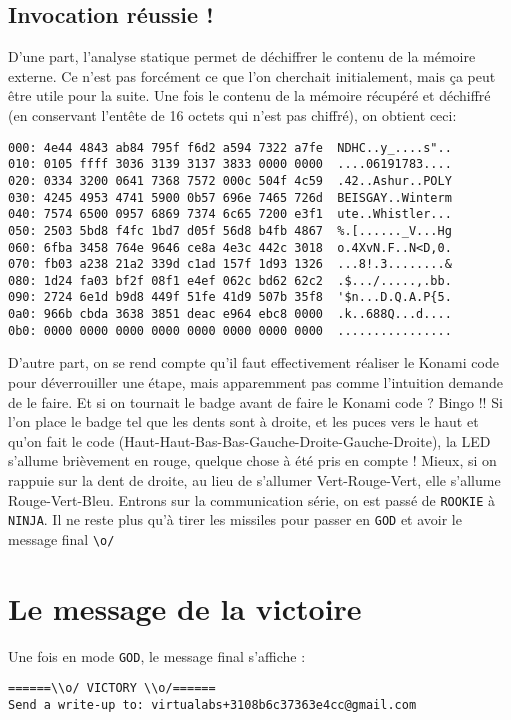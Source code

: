 \documentclass[11pt]{article}
\newcommand{\ttt}[1]{\texttt{#1}}
\begin{document}
    \subsection{Invocation réussie !}

    D'une part, l'analyse statique permet de déchiffrer le contenu de la mémoire externe. Ce n'est pas forcément ce que l'on cherchait initialement, mais ça peut être utile pour la suite. Une fois le contenu de la mémoire récupéré et déchiffré (en conservant l'entête de 16 octets qui n'est pas chiffré), on obtient ceci:

\begin{verbatim}
000: 4e44 4843 ab84 795f f6d2 a594 7322 a7fe  NDHC..y_....s"..
010: 0105 ffff 3036 3139 3137 3833 0000 0000  ....06191783....
020: 0334 3200 0641 7368 7572 000c 504f 4c59  .42..Ashur..POLY
030: 4245 4953 4741 5900 0b57 696e 7465 726d  BEISGAY..Winterm
040: 7574 6500 0957 6869 7374 6c65 7200 e3f1  ute..Whistler...
050: 2503 5bd8 f4fc 1bd7 d05f 56d8 b4fb 4867  %.[......_V...Hg
060: 6fba 3458 764e 9646 ce8a 4e3c 442c 3018  o.4XvN.F..N<D,0.
070: fb03 a238 21a2 339d c1ad 157f 1d93 1326  ...8!.3........&
080: 1d24 fa03 bf2f 08f1 e4ef 062c bd62 62c2  .$.../.....,.bb.
090: 2724 6e1d b9d8 449f 51fe 41d9 507b 35f8  '$n...D.Q.A.P{5.
0a0: 966b cbda 3638 3851 deac e964 ebc8 0000  .k..688Q...d....
0b0: 0000 0000 0000 0000 0000 0000 0000 0000  ................
\end{verbatim}

    D'autre part, on se rend compte qu'il faut effectivement réaliser le Konami code pour déverrouiller une étape, mais apparemment pas comme l'intuition demande de le faire. Et si on tournait le badge avant de faire le Konami code ? Bingo !! Si l'on place le badge tel que les dents sont à droite, et les puces vers le haut et qu'on fait le code (Haut-Haut-Bas-Bas-Gauche-Droite-Gauche-Droite), la LED s'allume brièvement en rouge, quelque chose à été pris en compte !
  Mieux, si on rappuie sur la dent de droite, au lieu de s'allumer Vert-Rouge-Vert, elle s'allume Rouge-Vert-Bleu. Entrons sur la communication série, on est passé de \ttt{ROOKIE} à \ttt{NINJA}. Il ne reste plus qu'à tirer les missiles pour passer en \ttt{GOD} et avoir le message final \verb|\o/|

  \section{Le message de la victoire}

  Une fois en mode \ttt{GOD}, le message final s'affiche :
\begin{verbatim}
======\\o/ VICTORY \\o/======
Send a write-up to: virtualabs+3108b6c37363e4cc@gmail.com
\end{verbatim}
\end{document}

